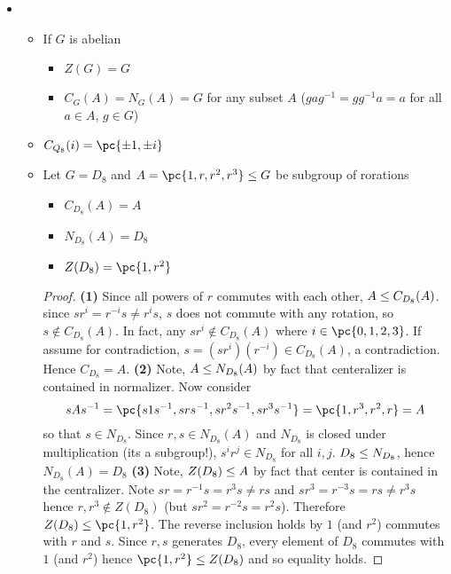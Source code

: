 \documentclass[11pt]{article}
\begin{document}
\begin{definition*}
\begin{itemize}
        \item {}
        \begin{itemize}
            \item If $G$ is abelian 
            \begin{itemize}
                \item $Z(G)=G$
                \item $C_G(A) = N_G(A) = G$ for any subset $A$ ($gag^{-1} = gg^{-1}a = a$ for all $a\in A$, $g\in G$)
            \end{itemize}
            \item $C_{Q_8}(i) = \pc{\pm 1, \pm i}$
            \item Let $G=D_8$ and $A = \pc{1,r,r^2,r^3} \subgroup G$ be subgroup of rorations
            \begin{itemize}
                \item $C_{D_8}(A) = A$
                \item $N_{D_8}(A) = D_8$
                \item $Z(D_8) = \pc{1,r^2}$
            \end{itemize}
            \begin{proof}
                \textbf{(1)} Since all powers of $r$ commutes with each other, $A\leq C_{D_8}(A)$. since $sr^i = r^{-i}s \neq r^is$, $s$ does not commute with any rotation, so $s\not\in C_{D_8}(A)$. In fact, any $sr^i \not\in C_{D_8}(A)$ where $i\in \pc{0,1,2,3}$. If assume for contradiction, $s = (sr^i)(r^{-i}) \in C_{D_8}(A)$, a contradiction. Hence $C_{D_8} = A$. \textbf{(2)} Note, $A \leq N_{D_8}(A)$ by fact that centeralizer is contained in normalizer. Now consider 
                \[
                    sAs^{-1} = \pc{
                        s1s^{-1}, srs^{-1}, sr^2s^{-1}, sr^3s^{-1}
                    } = \pc{
                        1, r^3,r^2,r
                    } = A
                \]
                so that $s\in N_{D_8}$. Since $r,s\in N_{D_8}(A)$ and $N_{D_8}$ is closed under multiplication (its a subgroup!), $s^i r^j \in N_{D_8}$ for all $i,j$. $D_8 \leq N_{D_8}$, hence $N_{D_8}(A) = D_8$ \textbf{(3)} Note, $Z(D_8) \leq A$ by fact that center is contained in the centralizer. Note $sr = r^{-1}s = r^3 s \neq rs$ and $sr^3 = r^{-3}s = rs \neq r^3s$ hence $r,r^3\not\in Z(D_8)$ (but $sr^2 = r^{-2}s = r^2s$). Therefore $Z(D_8) \subgroup \pc{1,r^2}$. The reverse inclusion holds by $1$ (and $r^2$) commutes with $r$ and $s$. Since $r,s$ generates $D_8$, every element of $D_8$ commutes with $1$ (and $r^2$) hence $\pc{1,r^2} \subgroup Z(D_8)$ and so equality holds.

\end{proof}
\end{itemize}
\end{itemize}
\end{definition*}
\end{document}
